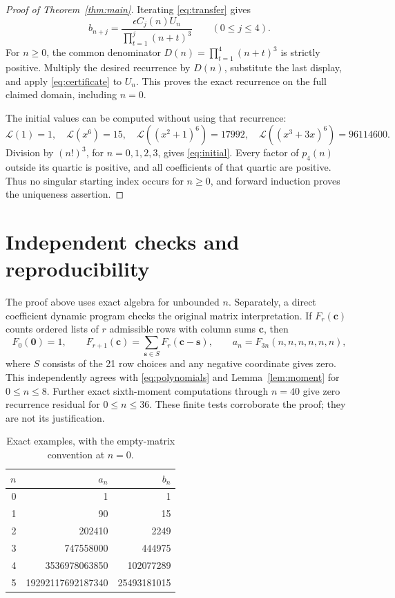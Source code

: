 \documentclass[11pt]{article}
\newcommand{\Lfun}{\mathcal L}
\newcommand{\bb}{\boldsymbol}
\begin{document}
\begin{proof}[Proof of Theorem~\ref{thm:main}]
Iterating \eqref{eq:transfer} gives
\[
 b_{n+j}=\frac{\epsilon C_j(n)U_n}{\prod_{t=1}^j(n+t)^3}
 \qquad(0\leq j\leq4).
\]
For $n\geq0$, the common denominator
$D(n)=\prod_{t=1}^4(n+t)^3$ is strictly positive. Multiply the desired
recurrence by $D(n)$, substitute the last display, and apply
\eqref{eq:certificate} to $U_n$. This proves the exact recurrence on the
full claimed domain, including $n=0$.

The initial values can be computed without using that recurrence:
\[
 \Lfun(1)=1,\quad \Lfun(x^6)=15,\quad
 \Lfun((x^2+1)^6)=17992,\quad
 \Lfun((x^3+3x)^6)=96114600.
\]
Division by $(n!)^3$, for $n=0,1,2,3$, gives
\eqref{eq:initial}. Every factor of $p_4(n)$ outside its quartic is
positive, and all coefficients of that quartic are positive. Thus no
singular starting index occurs for $n\geq0$, and forward induction proves
the uniqueness assertion.
\end{proof}

\section{Independent checks and reproducibility}
The proof above uses exact algebra for unbounded $n$. Separately, a direct
coefficient dynamic program checks the original matrix interpretation.
If $F_r(\bb c)$ counts ordered lists of $r$ admissible rows with column
sums $\bb c$, then
\[
 F_0(\bb0)=1,\qquad
 F_{r+1}(\bb c)=\sum_{\bb s\in S}F_r(\bb c-\bb s),\qquad
 a_n=F_{3n}(n,n,n,n,n,n),
\]
where $S$ consists of the 21 row choices and any negative coordinate
gives zero. This independently agrees with \eqref{eq:polynomials} and
Lemma~\ref{lem:moment} for $0\leq n\leq8$. Further exact sixth-moment
computations through $n=40$ give zero recurrence residual for
$0\leq n\leq36$. These finite tests corroborate the proof; they are not
its justification.

\begin{table}[ht]
\centering
\begin{tabular}{rrr}
\toprule
$n$&$a_n$&$b_n$\\
\midrule
0&1&1\\
1&90&15\\
2&202410&2249\\
3&747558000&444975\\
4&3536978063850&102077289\\
5&19292117692187340&25493181015\\
\bottomrule
\end{tabular}
\caption{Exact examples, with the empty-matrix convention at $n=0$.}
\end{table}
\end{document}
